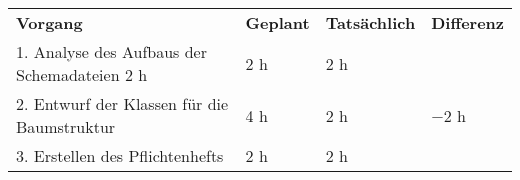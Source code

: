 \begin{tabularx}{\textwidth}{Xlll}
\rowcolor{heading}\textbf{Vorgang} & \textbf{Geplant} & \textbf{Tatsächlich} & \textbf{Differenz} \\
1. Analyse des Aufbaus der Schemadateien 2 h & 2 h   & 2 h   & \\
\rowcolor{odd}2. Entwurf der Klassen für die Baumstruktur & 4 h   & 2 h   & $-$2 h \\
3. Erstellen des Pflichtenhefts & 2 h   & 2 h   &  \\
\end{tabularx}
